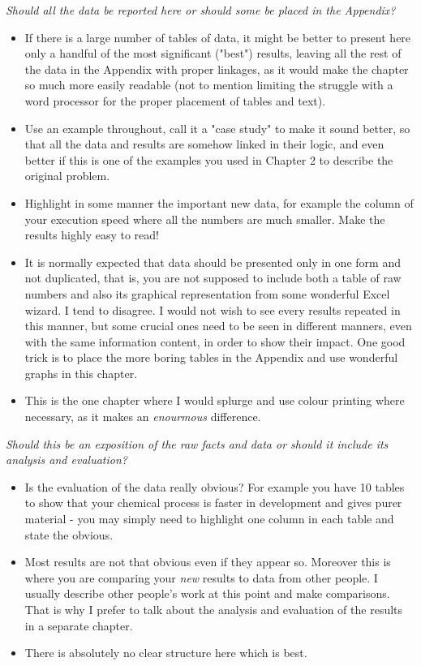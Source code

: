 \textit{Should all the data be reported here or should some be placed in the Appendix?}
    \begin{itemize}
    \item{If there is a large number of tables of data, it might be better to present here only a handful of the most significant ("best") results, leaving all the rest of the data in the Appendix with proper linkages, as it would make the chapter so much more easily readable (not to mention limiting the struggle with a word processor for the proper placement of tables and text).}
    \item{Use an example throughout, call it a "case study" to make it sound better, so that all the data and results are somehow linked in their logic, and even better if this is one of the examples you used in Chapter 2 to describe the original problem.}
    \item{Highlight in some manner the important new data, for example the column of your execution speed where all the numbers are much smaller. Make the results highly easy to read!}
    \item{It is normally expected that data should be presented only in one form and not duplicated, that is, you are not supposed to include both a table of raw numbers and also its graphical representation from some wonderful Excel wizard. I tend to disagree. I would not wish to see every results repeated in this manner, but some crucial ones need to be seen in different manners, even with the same information content, in order to show their impact. One good trick is to place the more boring tables in the Appendix and use wonderful graphs in this chapter.}
    \item{This is the one chapter where I would splurge and use colour printing where necessary, as it makes an \textit{enourmous} difference.}
    \end{itemize}

\textit{Should this be an exposition of the raw facts and data or should it include its analysis and evaluation?}
     \begin{itemize}
    \item{Is the evaluation of the data really obvious? For example you have 10 tables to show that your chemical process is faster in development and gives purer material - you may simply need to highlight one column in each table and state the obvious.}
    \item{Most results are not that obvious even if they appear so. Moreover this is where you are comparing your \textit{new} results to data from other people. I usually describe other people's work at this point and make comparisons. That is why I prefer to talk about the analysis and evaluation of the results in a separate chapter.}
    \item{There is absolutely no clear structure here which is best.}
    \end{itemize}
